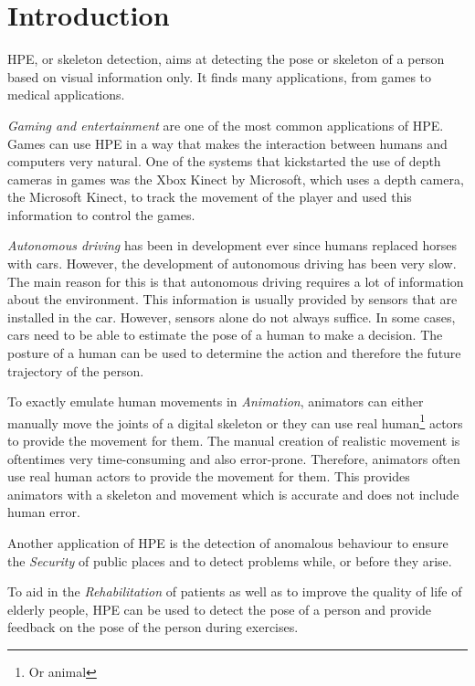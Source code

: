 \chapter{Introduction}
\setcounter{page}{1}
HPE, or skeleton detection, aims at detecting the pose or skeleton of a person based on visual information only. It finds many applications, from games to medical applications\cite{kumarapu2020animepose, ClinicalApplicationChen, MedicalAnimation}. 

\textit{Gaming and entertainment} are one of the most common applications of HPE. Games can use HPE in a way that makes the interaction between humans and computers very natural. One of the systems that kickstarted the use of depth cameras in games was the Xbox Kinect by Microsoft, which uses a depth camera, the Microsoft Kinect, to track the movement of the player and used this information to control the games.

\textit{Autonomous driving} has been in development ever since humans replaced horses with cars\cite{OldAutoDrive}. However, the development of autonomous driving has been very slow. The main reason for this is that autonomous driving requires a lot of information about the environment. This information is usually provided by sensors that are installed in the car. However, sensors alone do not always suffice. In some cases, cars need to be able to estimate the pose of a human to make a decision. The posture of a human can be used to determine the action and therefore the future trajectory of the person. 

To exactly emulate human movements in \textit{Animation}, animators can either manually move the joints of a digital skeleton or they can use real human\footnote{Or animal} actors to provide the movement for them. The manual creation of realistic movement is oftentimes very time-consuming and also error-prone. Therefore, animators often use real human actors to provide the movement for them. This provides animators with a skeleton and movement which is accurate and does not include human error.

Another application of HPE is the detection of anomalous behaviour to ensure the \textit{Security} of public places and to detect problems while, or before they arise.

To aid in the \textit{Rehabilitation} of patients as well as to improve the quality of life of elderly people, HPE can be used to detect the pose of a person and provide feedback on the pose of the person during exercises\cite{ClinicalApplicationChen}. 

